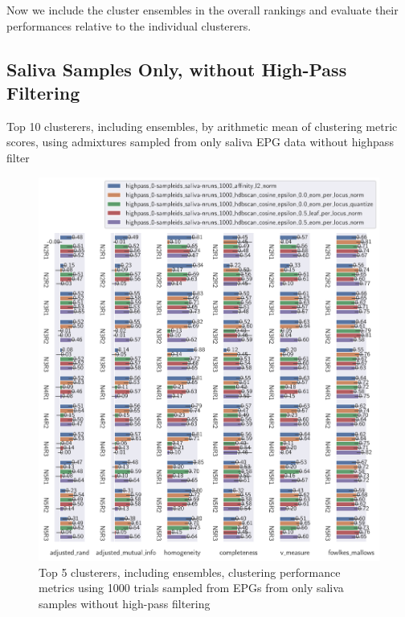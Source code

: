 Now we include the cluster ensembles in the overall rankings and evaluate their performances relative to the individual clusterers.

\FloatBarrier
\subsection{Saliva Samples Only, without High-Pass Filtering}

\begin{table}[htbp]
\centering
{}
\caption{Top 10 clusterers, including ensembles, by arithmetic mean of clustering metric scores, using admixtures sampled from only saliva EPG data without highpass filter}
\label{table:top_10_clusterers_by_metrics_highpass_0-sampleids_saliva-nruns_1000}
\end{table}

\begin{figure}[htbp]
\centering
\includegraphics[width=\textwidth]{./figures/clust_comparison/highpass_0-sampleids_saliva-nruns_1000_top_5_clusterers_including_ensembles_by_metrics.pdf}
\caption{Top 5 clusterers, including ensembles, clustering performance metrics using 1000 trials sampled from EPGs from only saliva samples without high-pass filtering}
\label{fig:highpass_0-sampleids_saliva-nruns_1000_top_5_clusterers_including_ensembles_by_metrics}
\end{figure}

